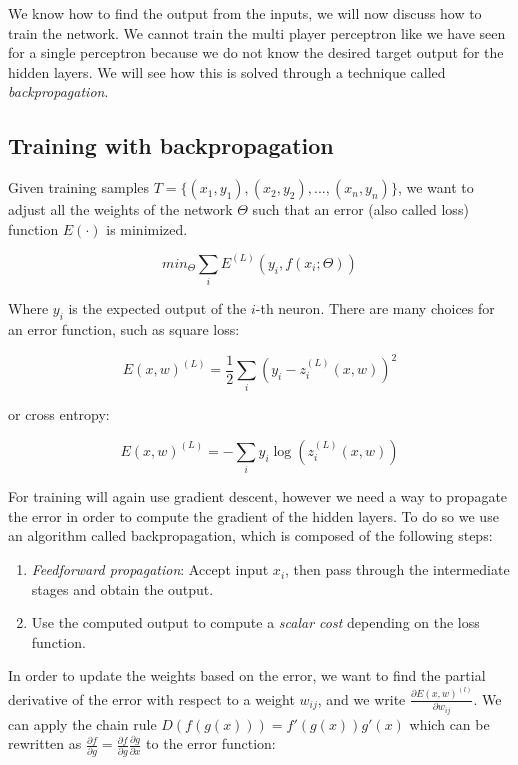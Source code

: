 \documentclass[11pt]{article}
\begin{document}
We know how to find the output from the inputs, we will now discuss how
to train the network. We cannot train the multi player perceptron like
we have seen for a single perceptron because we do not know the desired
target output for the hidden layers. We will see how this is solved
through a technique called \emph{backpropagation}.

\subsection{Training with
backpropagation}\label{training-with-backpropagation}

Given training samples
\(T=\{ (x_1, y_1), (x_2, y_2), ..., (x_n, y_n) \}\), we want to adjust
all the weights of the network \(\Theta\) such that an error (also
called loss) function \(E(\cdot)\) is minimized.

\[min_{\Theta} \sum _i E^{(L)}(y_i, f(x_i;\Theta))\]

Where \(y_i\) is the expected output of the \(i\)-th neuron. There are
many choices for an error function, such as square loss:

\[E(x, w)^{(L)}=\frac{1}{2}\sum_i (y_i-z_i^{(L)}(x, w))^2\]

or cross entropy:

\[E(x, w)^{(L)} = -\sum_i y_i \log(z_i^{(L)}(x, w))\]

For training will again use gradient descent, however we need a way to
propagate the error in order to compute the gradient of the hidden
layers. To do so we use an algorithm called backpropagation, which is
composed of the following steps:

\begin{enumerate}
\def\labelenumi{\arabic{enumi}.}
\tightlist
\item
  \emph{Feedforward propagation}: Accept input \(x_i\), then pass
  through the intermediate stages and obtain the output.
\item
  Use the computed output to compute a \emph{scalar cost} depending on
  the loss function.
\end{enumerate}

In order to update the weights based on the error, we want to find the
partial derivative of the error with respect to a weight \(w_{ij}\), and
we write \(\frac{\partial E(x, w)^{(l)}}{\partial w_{ij}}\). We can
apply the chain rule \(D(f(g(x)))=f'(g(x))g'(x)\) which can be rewritten
as
\(\frac{\partial f}{\partial g}=\frac{\partial f}{\partial g}\frac{\partial g}{\partial x}\)
to the error function:
\end{document}
